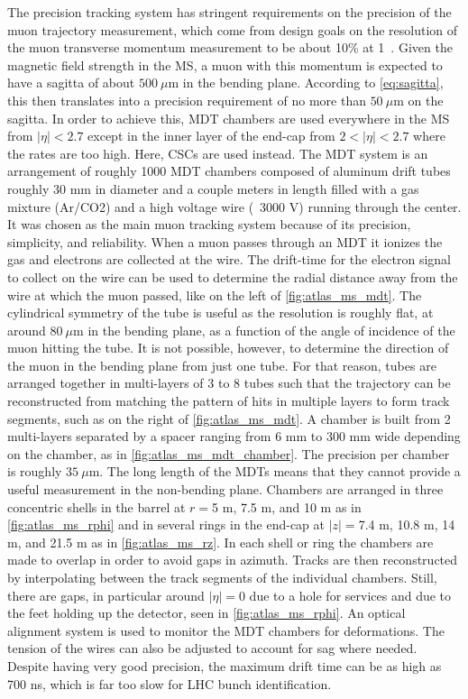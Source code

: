 
The precision tracking system has stringent requirements
on the precision of the muon trajectory measurement, 
which come from design goals on the resolution of the muon
transverse momentum measurement to be 
about 10\% at 1~\TeV.
Given the magnetic field strength in the MS, a muon 
with this momentum is expected to have a sagitta
of about $500~\mu$m in the bending plane. 
According to \eqn\eqref{eq:sagitta},
this then translates into a precision requirement of 
no more than $50~\mu$m on the sagitta.
In order to achieve this, MDT chambers are used everywhere 
in the MS from $|\eta|<2.7$ except in the inner layer of the 
end-cap from $2<|\eta|<2.7$
where the rates are too high. Here, CSCs are used instead. 
The MDT system is an arrangement of roughly 1000 MDT chambers composed
of aluminum drift tubes roughly 30 mm in diameter and a couple meters in length 
filled with a gas mixture
(Ar/CO2) and a high voltage wire (~3000 V)
running through the center. 
It was chosen as the main muon tracking system
because of its precision, simplicity, and reliability.
When a muon passes through an MDT
it ionizes the gas and electrons are collected at the wire.
The drift-time for the electron signal to collect on the wire
can be used to determine the radial distance away from the wire
at which the muon passed, like on the left of \fig\ref{fig:atlas_ms_mdt}. 
The cylindrical symmetry
of the tube is useful as the resolution is roughly flat, at around
$80~\mu$m in the bending plane, as a function
of the angle of incidence of the muon hitting the tube. 
It is not possible, however, to determine the direction
of the muon in the bending plane from just one tube.  For that reason, 
tubes are arranged together in multi-layers of 3 to 8 tubes such that 
the trajectory
can be reconstructed from matching the pattern of hits in multiple layers
to form track segments,
such as on the right of \fig\ref{fig:atlas_ms_mdt}.
A chamber is built from 2 multi-layers separated by a spacer ranging from
6 mm to 300 mm wide depending on 
the chamber, as in \fig\ref{fig:atlas_ms_mdt_chamber}.
The precision per chamber is roughly $35~\mu$m.
The long length of the MDTs means that they cannot provide a  useful measurement
in the non-bending plane.
Chambers are arranged in three concentric shells in the barrel 
at $r = $5 m, 7.5 m, and 10 m as in \fig\ref{fig:atlas_ms_rphi} 
and in several rings in the end-cap
at $|z| = $7.4 m, 10.8 m, 14 m, and 21.5 m as in \fig\ref{fig:atlas_ms_rz}.
In each shell or ring
the chambers are made to overlap in order to avoid gaps in azimuth.
Tracks are then reconstructed by interpolating between the 
track segments of the individual chambers.
Still, there are gaps, in particular around $|\eta|=0$ due to a hole for services
and due to the feet holding up the detector, seen in \fig\ref{fig:atlas_ms_rphi}.
An optical alignment system is used to monitor the MDT chambers %
for deformations. The tension of the wires can also be adjusted
to account for sag where needed. %
Despite having very good precision, the maximum drift time
can be as high as 700 ns, which is far too slow for LHC bunch identification.


